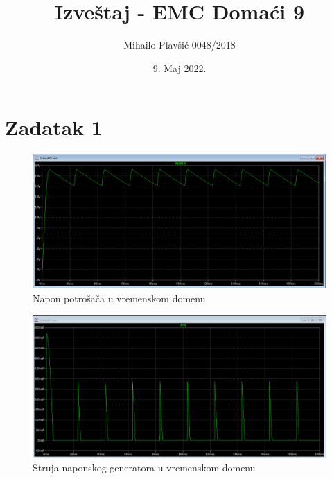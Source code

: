 \documentclass{article}
\title{Izveštaj - EMC Domaći 9}
\author{Mihailo Plavšić 0048/2018}
\date{9. Maj 2022.}
\begin{document}
\maketitle
\pagebreak

\section*{Zadatak 1}

\begin{figure}[H]
    \begin{center}
        \includegraphics[width=\textwidth]{Zadatak01_1.png}
        \caption[]{Napon potrošača u vremenskom domenu}
    \end{center}
\end{figure}

\begin{figure}[H]
    \begin{center}
        \includegraphics[width=\textwidth]{Zadatak01_2.png}
        \caption[]{Struja naponskog generatora u vremenskom domenu}
    \end{center}
\end{figure}
\end{document}
